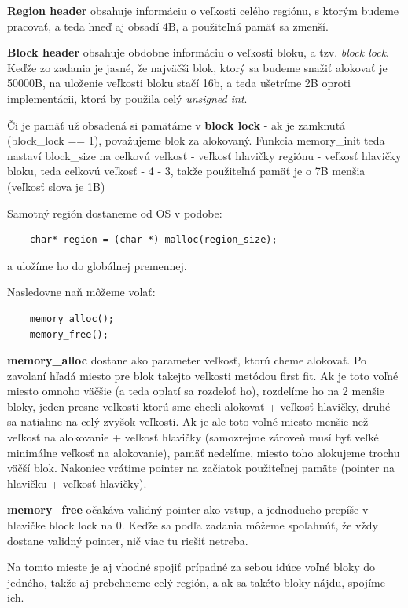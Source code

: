 \documentclass[a4paper,11pt]{article}
\theoremstyle{mytheor}
\begin{document}
\textbf{Region header} obsahuje informáciu o veľkosti celého regiónu, s ktorým budeme pracovať, a teda hneď aj obsadí 4B, a použiteľná pamäť sa zmenší.

\textbf{Block header} obsahuje obdobne informáciu o veľkosti bloku, a tzv. \textit{block lock}. Keďže zo zadania je jasné, že najväčši blok, ktorý sa budeme snažiť alokovať je 50000B, na uloženie veľkosti bloku stačí 16b, a teda ušetríme 2B oproti implementácii, ktorá by použila celý \textit{unsigned int}.

\newpage

Či je pamäť už obsadená si pamätáme v \textbf{block lock} - ak je zamknutá (block\_lock == 1), považujeme blok za alokovaný. Funkcia memory\_init teda nastaví block\_size na celkovú veľkosť - veľkosť hlavičky regiónu - veľkosť hlavičky bloku, teda celkovú veľkosť - 4 - 3, takže použiteľná pamäť je o 7B menšia (veľkosť slova je 1B)

Samotný región dostaneme od OS v podobe:
\begin{lstlisting}
	char* region = (char *) malloc(region_size);
\end{lstlisting}
a uložíme ho do globálnej premennej.

Nasledovne naň môžeme volať: 
\begin{lstlisting}
	memory_alloc();
	memory_free();
\end{lstlisting}

\textbf{memory\_alloc} dostane ako parameter veľkosť, ktorú cheme alokovať. Po zavolaní hľadá miesto pre blok takejto veľkosti metódou first fit. Ak je toto voľné miesto omnoho väčšie (a teda oplatí sa rozdeloť ho), rozdelíme ho na 2 menšie bloky, jeden presne veľkosti ktorú sme chceli alokovať + veľkosť hlavičky, druhé sa natiahne na celý zvyšok veľkosti. Ak je ale toto voľné miesto menšie než veľkosť na alokovanie + veľkosť hlavičky (samozrejme zároveň musí byť veľké minimálne veľkosť na alokovanie), pamäť nedelíme, miesto toho alokujeme trochu väčší blok. Nakoniec vrátime pointer na začiatok použiteľnej pamäte (pointer na hlavičku + veľkosť hlavičky).

\textbf{memory\_free} očakáva validný pointer ako vstup, a jednoducho prepíše v hlavičke block lock na 0. Keďže sa podľa zadania môžeme spoľahnúť, že vždy dostane validný pointer, nič viac tu riešiť netreba.

Na tomto mieste je aj vhodné spojiť prípadné za sebou idúce voľné bloky do jedného, takže aj prebehneme celý región, a ak sa takéto bloky nájdu, spojíme ich.
\end{document}

